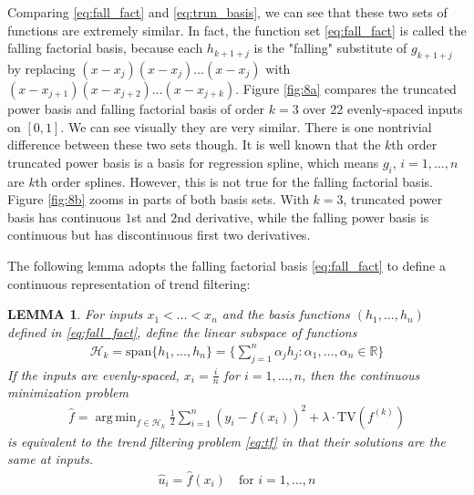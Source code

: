 \documentclass[a4paper]{article}
\DeclareMathOperator*{\argmin}{arg\,min}
\newtheorem{lemma}{LEMMA}
\newcommand{\RR}{\mathbb{R}}
\renewcommand{\cal}{\mathcal}
\begin{document}


Comparing \eqref{eq:fall_fact} and \eqref{eq:trun_basis}, we can see that these two sets of functions are extremely similar. In fact, the function set \eqref{eq:fall_fact} is called the falling factorial basis\cite{wang2014falling}, because each $h_{k+1+j}$ is the "falling" substitute of $g_{k+1+j}$ by replacing $(x-x_j)(x-x_j)\ldots(x-x_j)$ with $(x-x_{j+1})(x-x_{j+2})\ldots(x-x_{j+k})$. Figure \ref{fig:8a} compares the truncated power basis and falling factorial basis of order $k = 3$ over 22 evenly-spaced inputs on $[0, 1]$. We can see visually they are very similar. There is one nontrivial difference between these two sets though. It is well known that the $k$th order truncated power basis is a basis for regression spline, which means $g_i$, $i=1,\ldots, n$ are $k$th order splines. However, this is not true for the falling factorial basis. Figure \ref{fig:8b} zooms in parts of both basis sets. With $k =3$, truncated power basis has continuous $1$st and $2$nd derivative, while the falling power basis is continuous but has discontinuous first two derivatives.

The following lemma adopts the falling factorial basis \eqref{eq:fall_fact} to define a continuous representation of trend filtering:
\begin{lemma}
For inputs $x_1<\ldots<x_n$ and the basis functions $(h_1,\ldots, h_n)$ defined in \eqref{eq:fall_fact}, define the linear subspace of functions
\begin{align}
\cal{H}_k = \text{span}\{h_1,\ldots, h_n\} = \Big\{\sum_{j=1}^n \alpha_jh_j:\alpha_1,\ldots, \alpha_n\in\RR\Big\}
\label{eq:linear_class}
\end{align}
If the inputs are evenly-spaced, $x_i=\frac{i}{n}$ for $i=1,\ldots, n$, then the continuous minimization problem
\begin{align}
\hat{f} = \argmin_{f\in\cal{H}_k} \frac{1}{2}\sum_{i=1}^n(y_i-f(x_i))^2 + \lambda\cdot\text{TV}(f^{(k)})
\end{align}
is equivalent to the trend filtering problem \eqref{eq:tf} in that their solutions are the same at inputs.
\begin{align*}
\hat{u}_i = \hat{f}(x_i) \quad \text{for } i=1,\ldots,n  
\end{align*}
\label{lemma:cont}
\end{lemma}
\end{document}
